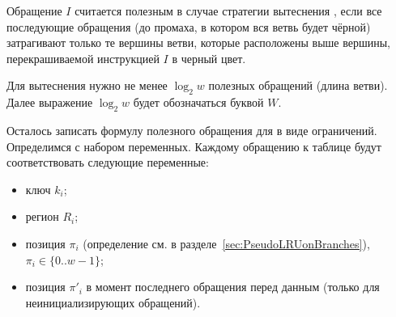 \begin{utv}
Обращение $I$ считается полезным в случае стратегии вытеснения \PseudoLRU, если все последующие обращения (до промаха, в котором вся ветвь будет чёрной) затрагивают только те вершины ветви, которые расположены выше вершины, перекрашиваемой инструкцией $I$ в черный цвет.
\end{utv}

Для вытеснения нужно не менее $\log_2 w$ полезных обращений (длина ветви). Далее выражение $\log_2 w$ будет обозначаться буквой $W$.

%
%
%

Осталось записать формулу полезного обращения для \PseudoLRU в виде ограничений. Определимся с набором переменных. Каждому обращению к таблице будут соответствовать следующие переменные:
\begin{itemize}
  \item ключ $k_i$;
  \item регион $R_i$;
  \item позиция $\pi_i$ (определение см. в разделе~\ref{sec:PseudoLRUonBranches}), $\pi_i \in \{0..w{-}1\}$;
  \item позиция $\pi'_i$ в момент последнего обращения перед данным (только для неинициализирующих обращений).
\end{itemize}

